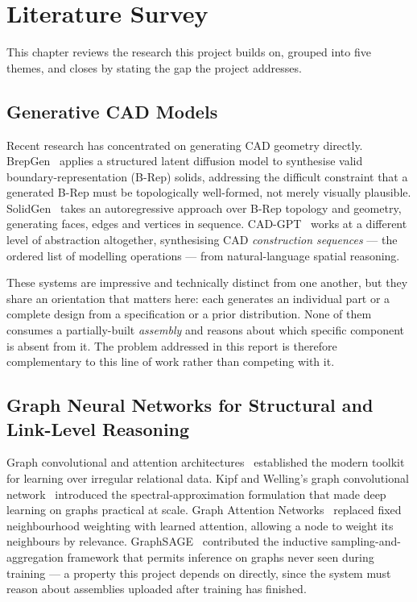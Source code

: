 \documentclass[12pt,oneside,a4paper]{report}
\begin{document}
\chapter{Literature Survey}

This chapter reviews the research this project builds on, grouped into five
themes, and closes by stating the gap the project addresses.

\section{Generative CAD Models}

Recent research has concentrated on generating CAD geometry directly.
BrepGen~\cite{brepgen2024} applies a structured latent diffusion model to
synthesise valid boundary-representation (B-Rep) solids, addressing the
difficult constraint that a generated B-Rep must be topologically
well-formed, not merely visually plausible.
SolidGen~\cite{solidgen2024} takes an autoregressive approach over B-Rep
topology and geometry, generating faces, edges and vertices in sequence.
CAD-GPT~\cite{cadgpt2025} works at a different level of abstraction
altogether, synthesising CAD \emph{construction sequences} --- the ordered
list of modelling operations --- from natural-language spatial reasoning.

These systems are impressive and technically distinct from one another, but
they share an orientation that matters here: each generates an individual
part or a complete design from a specification or a prior distribution. None
of them consumes a partially-built \emph{assembly} and reasons about which
specific component is absent from it. The problem addressed in this report is
therefore complementary to this line of work rather than competing with it.

\section{Graph Neural Networks for Structural and Link-Level Reasoning}

Graph convolutional and attention
architectures~\cite{kipf2017gcn,velickovic2018gat,hamilton2017sage}
established the modern toolkit for learning over irregular relational data.
Kipf and Welling's graph convolutional network~\cite{kipf2017gcn} introduced
the spectral-approximation formulation that made deep learning on graphs
practical at scale. Graph Attention Networks~\cite{velickovic2018gat} replaced
fixed neighbourhood weighting with learned attention, allowing a node to
weight its neighbours by relevance. GraphSAGE~\cite{hamilton2017sage}
contributed the inductive sampling-and-aggregation framework that permits
inference on graphs never seen during training --- a property this project
depends on directly, since the system must reason about assemblies uploaded
after training has finished.
\end{document}
